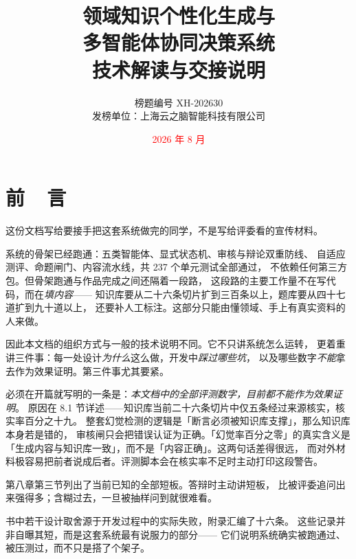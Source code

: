 \documentclass[utf8]{book}
\providecommand{\NeedCheck}[1]{\textcolor{red}{#1}}
\begin{document}
\raggedbottom
\setlength{\fboxsep}{4pt}
\setlength{\tabcolsep}{3pt}

\title{\heiti 领域知识个性化生成与\\多智能体协同决策系统\\[6pt]技术解读与交接说明}

\author{\fangsong 榜题编号 XH-202630\\[4pt]发榜单位：上海云之脑智能科技有限公司}

\date{\NeedCheck{2026 年 8 月}}

\frontmatter

\maketitle

\chapter{前~~言}

这份文档写给要接手把这套系统做完的同学，不是写给评委看的宣传材料。

系统的骨架已经跑通：五类智能体、显式状态机、审核与辩论双重防线、
自适应测评、命题闸门、内容流水线，共 237 个单元测试全部通过，
不依赖任何第三方包。但骨架跑通与作品完成之间还隔着一段路，
这段路的主要工作量不在写代码，而在\emph{填内容}——
知识库要从二十六条切片扩到三百条以上，题库要从四十七道扩到九十道以上，
还要补人工标注。这部分只能由懂领域、手上有真实资料的人来做。

因此本文档的组织方式与一般的技术说明不同。它不只讲系统怎么运转，
更着重讲三件事：每一处设计\emph{为什么}这么做，开发中\emph{踩过哪些坑}，
以及哪些数字\emph{不能}拿去作为效果证明。第三件事尤其要紧。

必须在开篇就写明的一条是：\emph{本文档中的全部评测数字，目前都不能作为效果证明}。
原因在 8.1 节详述——知识库当前二十六条切片中仅五条经过来源核实，核实率百分之十九。
整套幻觉检测的逻辑是「断言必须被知识库支撑」，那么知识库本身若是错的，
审核闸只会把错误认证为正确。「幻觉率百分之零」的真实含义是
「生成内容与知识库一致」，而不是「内容正确」。这两句话差得很远，
而对外材料极容易把前者说成后者。评测脚本会在核实率不足时主动打印这段警告。

第八章第三节列出了当前已知的全部短板。答辩时主动讲短板，
比被评委追问出来强得多；含糊过去，一旦被抽样问到就很难看。

书中若干设计取舍源于开发过程中的实际失败，附录汇编了十六条。
这些记录并非自曝其短，而是这套系统最有说服力的部分——
它们说明系统确实被跑通过、被压测过，而不只是搭了个架子。
\end{document}

